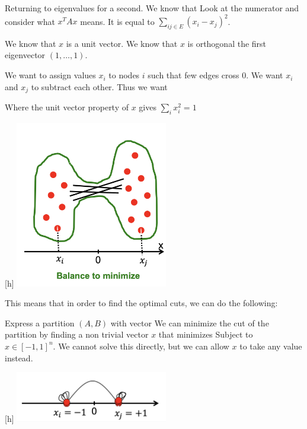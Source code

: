     Returning to eigenvalues for a second. We know that 
    Look at the numerator and consider what $x^T Ax$ means. It is equal to $\sum_{ij \in E}(x_i - x_j)^2$. 
    
    We know that $x$ is a unit vector. We know that $x$ is orthogonal the first eigenvector $(1, \dots, 1)$. 
    
    We want to assign values $x_i$ to nodes $i$ such that few edges cross $0$. We want $x_i$ and $x_j$ to subtract each other. Thus we want 
    
    Where the unit vector property of $x$ gives $\sum_i x_i^2 = 1$
        
    \begin{center}[h]
        \includegraphics[width=0.5\textwidth]{images/balance.png}
    \end{center}
    
    This means that in order to find the optimal cuts, we can do the following:
    
    Express a partition $(A, B)$ with vector 
    We can minimize the cut of the partition by finding a non trivial vector $x$ that minimizes
    Subject to $x \in [-1, 1]^n$. We cannot solve this directly, but we can allow $x$ to take any value instead. 
    
    \begin{center}[h]
        \includegraphics[width=0.5\textwidth]{images/lr.png}
    \end{center}
    
